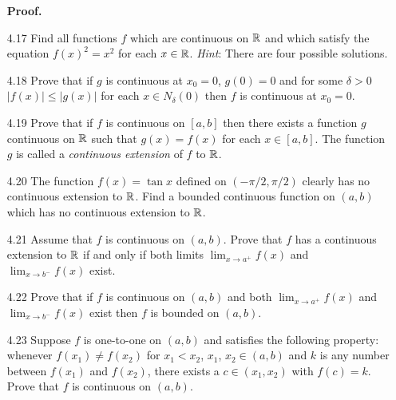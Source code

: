 \begin{enumerate}
      \textbf{Proof.} 
   \item[4.17] Find all functions $f$ which are continuous on $\mathbb{R}$ and which
               satisfy the equation $f(x)^2 = x^2$ for each $x \in \mathbb{R}$.
               \textit{Hint}: There are four possible solutions.
   \item[4.18] Prove that if $g$ is continuous at $x_0 = 0$, $g(0) = 0$ and for
               some $\delta > 0$ $|f(x)| \le |g(x)|$ for each
               $x \in N_\delta(0)$ then $f$ is continuous at $x_0 = 0$.
   \item[4.19] Prove that if $f$ is continuous on $[a, b]$ then there exists a
               function $g$ continuous on $\mathbb{R}$ such that $g(x) = f(x)$ for each
               $x \in [a, b]$. The function $g$ is called a
               \textit{continuous extension} of $f$ to $\mathbb{R}$.
   \item[4.20] The function $f(x) = \tan x$ defined on $(-\pi/2, \pi/2)$ clearly
               has no continuous extension to $\mathbb{R}$. Find a bounded continuous
               function on $(a, b)$ which has no continuous extension to $\mathbb{R}$.
   \item[4.21] Assume that $f$ is continuous on $(a, b)$. Prove that $f$ has a
               continuous extension to $\mathbb{R}$ if and only if both limits
               $\lim_{x\rightarrow a^+}f(x)$ and $\lim_{x\rightarrow b^-}f(x)$
               exist.
   \item[4.22] Prove that if $f$ is continuous on $(a, b)$ and both
               $\lim_{x\rightarrow a^+}f(x)$ and $\lim_{x\rightarrow b^-}f(x)$
               exist then $f$ is bounded on $(a, b)$.
   \item[4.23] Suppose $f$ is one-to-one on $(a, b)$ and satisfies the following
               property: whenever $f(x_1) \neq f(x_2)$ for $x_1 < x_2$, $x_1$,
               $x_2 \in (a, b)$ and $k$ is any number between $f(x_1)$ and
               $f(x_2)$, there exists a $c \in (x_1, x_2)$ with $f(c) = k$.
               Prove that $f$ is continuous on $(a, b)$.
\end{enumerate}
